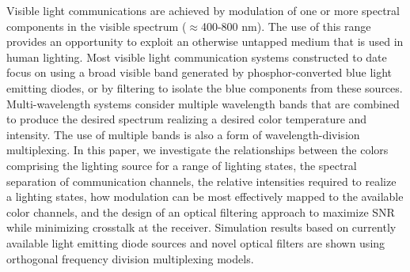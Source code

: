 Visible light communications are achieved by modulation of one or more spectral components in the visible spectrum ($\approx$400-800 nm). The use of this range provides an opportunity to exploit an otherwise untapped medium that is used in human lighting. Most visible light communication systems constructed to date focus on using a broad visible band generated by phosphor-converted blue light emitting diodes, or by filtering to isolate the blue components from these sources. Multi-wavelength systems consider multiple wavelength bands that are combined to produce the desired spectrum realizing a desired color temperature and intensity. The use of multiple bands is also a form of wavelength-division multiplexing. In this paper, we investigate the relationships between the colors comprising the lighting source for a range of lighting states, the spectral separation of communication channels, the relative intensities required to realize a lighting states, how modulation can be most effectively mapped to the available color channels, and the design of an optical filtering approach to maximize SNR while minimizing crosstalk at the receiver. Simulation results based on currently available light emitting diode sources and novel optical filters are shown using orthogonal frequency division multiplexing models. 